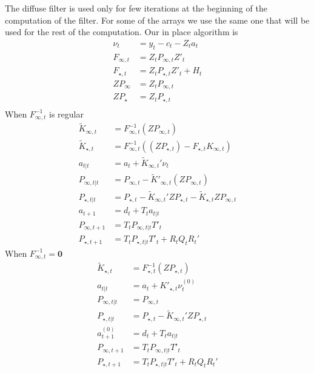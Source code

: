 \documentclass{article}
\begin{document}
The diffuse filter is used only for few iterations at the beginning of
the computation of the filter. For some of the arrays we use the same
one that will be used for the rest of the computation. Our in place
algorithm is
\begin{align*}
  \nu_t &= y_t - c_t - Z_t a_t \\
  F_{\infty,t} &= Z_tP_{\infty,t}Z'_t \\
  F_{\star,t} &= Z_tP_{\star,t}Z'_t + H_t \\
  ZP_\infty &= Z_tP_{\infty,t}\\
  ZP_\star &= Z_tP_{\star,t} \\
\end{align*}
When $F^{-1}_{\infty,t}$ is regular
\begin{align*}
  \tilde K_{\infty,t} &= F^{-1}_{\infty,t}(ZP_{\infty,t}) \\
  \tilde K_{\star,t} &=  F^{-1}_{\infty,t}((ZP_{\star,t}) - F_{\star,t}K_{\infty,t}) \\
  a_{t|t} &= a_t + \tilde K_{\infty,t}'\nu_t\\
  P_{\infty,t|t} &= P_{\infty,t} - \tilde K'_{\infty,t}(ZP_{\infty,t}) \\
  P_{\star,t|t} &= P_{\star,t} - \tilde K_{\infty,t}'ZP_{\star,t}
                  - \tilde K_{\star,t}ZP_{\infty,t}\\
  a_{t+1} &= d_t + T_ta_{t|t} \\
  P_{\infty,t+ 1} &= T_tP_{\infty,t|t}T'_t\\
  P_{\star, t+1} &= T_tP_{\star,t|t}T'_t + R_tQ_tR_t'
\end{align*}
When $F^{-1}_{\infty,t} = \mathbf{0}$
\begin{align*}
  \tilde K_{\star,t} &= F^{-1}_{\star,t}(ZP_{\star,t})\\
  a_{t|t} &= a_t + K'_{\star,t}\nu^{(0)}_t\\
  P_{\infty,t|t} &= P_{\infty,t} \\
  P_{\star,t|t} &= P_{\star,t} - \tilde K_{\infty,t}'ZP_{\star,t}\\
  a^{(0)}_{t+1} &= d_t + T_ta_{t|t}\\
  P_{\infty,t+ 1} &= T_tP_{\infty,t|t}T'_t \\
  P_{\star, t+1} &= T_tP_{\star,t|t}T'_t + R_tQ_tR_t' 
\end{align*}
\end{document}

